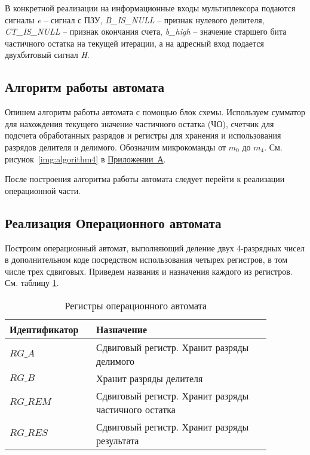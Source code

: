 \documentclass[a4paper,14pt]{extarticle}
\begin{document}
В конкретной реализации на информационные входы мультиплексора подаются сигналы \textit{e} -- сигнал с ПЗУ, \textit{B\_IS\_NULL} -- признак нулевого делителя, \textit{CT\_IS\_NULL} -- признак окончания счета, \textit{b\_high} -- значение старшего бита частичного остатка на текущей итерации, а на адресный вход подается двухбитовый сигнал \textit{H}.
\subsection{Алгоритм работы автомата}
Опишем алгоритм работы автомата с помощью блок схемы. Используем сумматор для нахождения текущего значение частичного остатка (ЧО), счетчик для подсчета обработанных разрядов и регистры для хранения и использования разрядов делителя и делимого. Обозначим микрокоманды от $m_0$ до $m_4$. См. рисунок~\ref{img:algorithm4} в \hyperref[tam]{Приложении~А}.

После построения алгоритма работы автомата следует перейти к реализации операционной части.

\subsection {Реализация Операционного автомата}
Построим операционный автомат, выполняющий деление двух 4-разрядных чисел в дополнительном коде посредством использования четырех регистров, в том числе трех сдвиговых. Приведем названия и назначения каждого из регистров. См. таблицу \ref{tab:regs4}.
\begin{table}[h!]
	\centering
	\begin{tabular}{|m{0.27\linewidth}|m{0.6\linewidth}|}
		\hline
		\textbf{Идентификатор} & \textbf{Назначение} \\ \hline
		$RG\_A$ & Сдвиговый регистр. Хранит разряды делимого \\ \hline
		$RG\_B$ & Хранит разряды делителя \\ \hline
		$RG\_REM$ & Сдвиговый регистр. Хранит разряды частичного остатка \\ \hline
		$RG\_RES$ & Сдвиговый регистр. Хранит разряды результата \\ \hline
	\end{tabular}
	\caption{Регистры операционного автомата}
	\label{tab:regs4}
\end{table}
\end{document}
